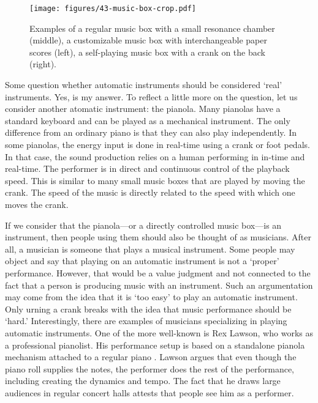\begin{figure}[tbp]
     \texttt{[image: figures/43-music-box-crop.pdf]}
     \caption{Examples of a regular music box with a small resonance chamber (middle), a customizable music box with interchangeable paper scores (left), a self-playing music box with a crank on the back (right).}
     \label{fig:music-box}
\end{figure}

Some question whether automatic instruments should be considered `real' instruments. Yes, is my answer. To reflect a little more on the question, let us consider another atomatic instrument: the pianola. Many pianolas have a standard keyboard and can be played as a mechanical instrument. The only difference from an ordinary piano is that they can also play independently. In some pianolas, the energy input is done in real-time using a crank or foot pedals. In that case, the sound production relies on a human performing in in-time and real-time. The performer is in direct and continuous control of the playback speed. This is similar to many small music boxes that are played by moving the crank. The speed of the music is directly related to the speed with which one moves the crank.

If we consider that the pianola---or a directly controlled music box---is an instrument, then people using them should also be thought of as musicians. After all, a musician is someone that plays a musical instrument. Some people may object and say that playing on an automatic instrument is not a `proper' performance. However, that would be a value judgment and not connected to the fact that a person is producing music with an instrument. Such an argumentation may come from the idea that it is `too easy' to play an automatic instrument. Only urning a crank breaks with the idea that music performance should be `hard.' Interestingly, there are examples of musicians specializing in playing automatic instruments. One of the more well-known is Rex Lawson, who works as a professional pianolist. His performance setup is based on a standalone pianola mechanism attached to a regular piano \citep{peress_dvorak_2004}. Lawson argues that even though the piano roll supplies the notes, the performer does the rest of the performance, including creating the dynamics and tempo. The fact that he draws large audiences in regular concert halls attests that people see him as a performer.

